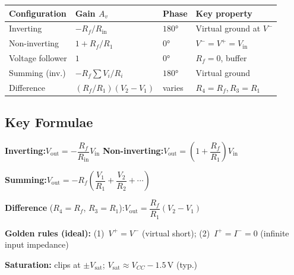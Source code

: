 \documentclass[a4paper, 11pt]{article}
\begin{document}
\begin{center}\renewcommand{\arraystretch}{1.3}
\begin{tabular}{llll}
\toprule
\textbf{Configuration} & \textbf{Gain $A_v$} & \textbf{Phase} & \textbf{Key property} \\
\midrule
Inverting           & $-R_f/R_{\mathrm{in}}$       & $180°$ & Virtual ground at $V^-$ \\
Non-inverting       & $1+R_f/R_1$                   & $0°$   & $V^-=V^+=V_{\mathrm{in}}$ \\
Voltage follower    & $1$                            & $0°$   & $R_f=0$, buffer \\
Summing (inv.)      & $-R_f\!\sum V_i/R_i$          & $180°$ & Virtual ground \\
Difference          & $(R_f/R_1)(V_2-V_1)$         & varies & $R_4=R_f$,\,$R_3=R_1$ \\
\bottomrule
\end{tabular}
\end{center}

\subsection{Key Formulae}

\begin{tcolorbox}[enhanced, breakable,
  colback=LightBG, colframe=DeepNavy, colbacktitle=DeepNavy, coltitle=white,
  fonttitle=\bfseries\sffamily\small, title={\faSquareRootAlt\enspace Key Formulae},
  arc=6pt, boxrule=1.5pt, left=8pt, right=8pt, top=6pt, bottom=6pt]
\textbf{Inverting:}\quad $V_{\mathrm{out}}=-\dfrac{R_f}{R_{\mathrm{in}}}V_{\mathrm{in}}$\hspace{3em}
\textbf{Non-inverting:}\quad $V_{\mathrm{out}}=\!\left(1+\dfrac{R_f}{R_1}\right)V_{\mathrm{in}}$

\smallskip
\textbf{Summing:}\quad $V_{\mathrm{out}}=-R_f\!\left(\dfrac{V_1}{R_1}+\dfrac{V_2}{R_2}+\cdots\right)$

\smallskip
\textbf{Difference} ($R_4=R_f$, $R_3=R_1$):\quad $V_{\mathrm{out}}=\dfrac{R_f}{R_1}(V_2-V_1)$

\smallskip
\textbf{Golden rules (ideal):}\enspace
(1)~$V^+=V^-$ (virtual short);\enspace
(2)~$I^+=I^-=0$ (infinite input impedance)

\smallskip
\textbf{Saturation:} clips at $\pm V_{\mathrm{sat}}$;\enspace
$V_{\mathrm{sat}}\approx V_{CC}-1.5\,\text{V}$ (typ.)
\end{tcolorbox}
\end{document}
